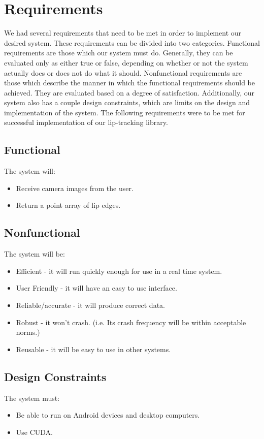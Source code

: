 \chapter{Requirements}

We had several requirements that need to be met in order to implement our desired system. These requirements can be divided into two categories. Functional requirements are those which our system must do. Generally, they can be evaluated only as either true or false, depending on whether or not the system actually does or does not do what it should. Nonfunctional requirements are those which describe the manner in which the functional requirements should be achieved. They are evaluated based on a degree of satisfaction. Additionally, our system also has a couple design constraints, which are limits on the design and implementation of the system. The following requirements were to be met for successful implementation of our lip-tracking library.

\section{Functional}
The system will:
\begin{itemize}
\item Receive camera images from the user.
\item Return a point array of lip edges.
\end{itemize}


\section{Nonfunctional}
The system will be:
\begin{itemize}
\item Efficient - it will run quickly enough for use in a real time system.
\item User Friendly - it will have an easy to use interface.
\item Reliable/accurate - it will produce correct data.
\item Robust - it won't crash. (i.e. Its crash frequency will be within acceptable norms.)
\item Reusable - it will be easy to use in other systems.
\end{itemize}


\section{Design Constraints}
The system must:
\begin{itemize}
\item Be able to run on Android devices and desktop computers.
\item Use CUDA.
\end{itemize}